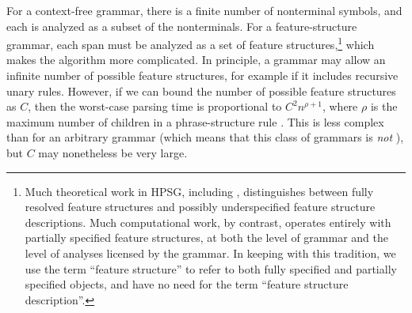 \documentclass[output=paper
	        ,collection
	        ,collectionchapter
 	        ,biblatex
                ,babelshorthands
                ,newtxmath
                ,draftmode
                ,colorlinks, citecolor=brown
]{langscibook}
\begin{document}
For a context-free grammar,
there is a finite number of nonterminal symbols,
and each  is analyzed as a subset of the nonterminals.
For a feature-structure grammar, each span must be analyzed as a set of feature structures,\footnote{%
	Much theoretical work in HPSG, including \citet{ps2},
	distinguishes between fully resolved feature structures and possibly underspecified feature structure descriptions.
	Much computational work, by contrast, operates entirely with partially specified feature structures,
	at both the level of grammar and the level of analyses licensed by the grammar.
	In keeping with this tradition, we use the term
	``feature structure'' to refer to both fully specified and partially specified objects,
	and have no need for the term ``feature structure description''.
}
which makes the algorithm more complicated.
In principle, a grammar may allow an infinite number of possible feature structures,
for example if it includes recursive unary rules.
However, if we can bound the number of possible feature structures as $C$,
then the worst-case parsing time is proportional to $C^2 n^{\rho+1}$,
where $\rho$ is the maximum number of children in a phrase-structure rule
\citep[Section~3.2.3]{carroll1993parse}. 
This is less complex than for an arbitrary grammar
(which means that this class of grammars is \emph{not} ),
but $C$ may nonetheless be very large.

\end{document}
